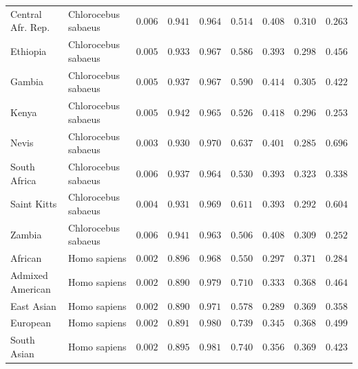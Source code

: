 \documentclass{article}
\begin{document}
\begin{center}
\begin{adjustbox}{width=\textwidth}
\begin{tabular}{||l|l|r||r|r||r|r||r|r||}
                \rowcolor{LIGHTGREY} Central Afr. Rep.       & Chlorocebus sabaeus & $ 0.006$ & $ 0.941$ & $ 0.964$ & $ 0.514$ & $ 0.408$ & $ 0.310$ & $ 0.263$ \\
                \rowcolor{LIGHTGREY} Ethiopia        & Chlorocebus sabaeus & $ 0.005$ & $ 0.933$ & $ 0.967$ & $ 0.586$ & $ 0.393$ & $ 0.298$ & $ 0.456$ \\
                \rowcolor{LIGHTGREY} Gambia             & Chlorocebus sabaeus & $ 0.005$ & $ 0.937$ & $ 0.967$ & $ 0.590$ & $ 0.414$ & $ 0.305$ & $ 0.422$ \\
                \rowcolor{LIGHTGREY} Kenya                                 & Chlorocebus sabaeus        & $ 0.005$ & $ 0.942$ & $ 0.965$ & $ 0.526$ & $ 0.418$ & $ 0.296$ & $ 0.253$ \\
                \rowcolor{LIGHTGREY} Nevis                        & Chlorocebus sabaeus        & $ 0.003$ & $ 0.930$ & $ 0.970$ & $ 0.637$ & $ 0.401$ & $ 0.285$ & $ 0.696$ \\
                \rowcolor{LIGHTGREY} South Africa                              & Chlorocebus sabaeus        & $ 0.006$ & $ 0.937$ & $ 0.964$ & $ 0.530$ & $ 0.393$ & $ 0.323$ & $ 0.338$ \\
                \rowcolor{LIGHTGREY} Saint Kitts                                & Chlorocebus sabaeus        & $ 0.004$ & $ 0.931$ & $ 0.969$ & $ 0.611$ & $ 0.393$ & $ 0.292$ & $ 0.604$ \\
                \rowcolor{LIGHTGREY} Zambia                             & Chlorocebus sabaeus        & $ 0.006$ & $ 0.941$ & $ 0.963$ & $ 0.506$ & $ 0.408$ & $ 0.309$ & $ 0.252$ \\
                African                             & Homo sapiens        & $ 0.002$ & $ 0.896$ & $ 0.968$ & $ 0.550$ & $ 0.297$ & $ 0.371$ & $ 0.284$ \\
                Admixed American                             & Homo sapiens        & $ 0.002$ & $ 0.890$ & $ 0.979$ & $ 0.710$ & $ 0.333$ & $ 0.368$ & $ 0.464$ \\
                East Asian                             & Homo sapiens        & $ 0.002$ & $ 0.890$ & $ 0.971$ & $ 0.578$ & $ 0.289$ & $ 0.369$ & $ 0.358$ \\
                European                             & Homo sapiens        & $ 0.002$ & $ 0.891$ & $ 0.980$ & $ 0.739$ & $ 0.345$ & $ 0.368$ & $ 0.499$ \\
                South Asian                             & Homo sapiens        & $ 0.002$ & $ 0.895$ & $ 0.981$ & $ 0.740$ & $ 0.356$ & $ 0.369$ & $ 0.423$ \\
                \bottomrule
            \end{tabular}
        \end{adjustbox}
    \end{center}
\end{document}
